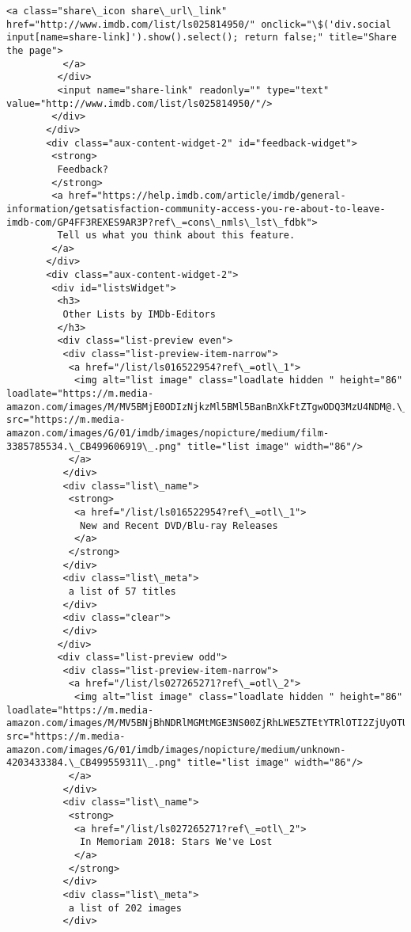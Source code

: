 \documentclass[11pt]{article}
\begin{document}
\begin{Verbatim}[commandchars=\\\{\}]
          <a class="share\_icon share\_url\_link" href="http://www.imdb.com/list/ls025814950/" onclick="\$('div.social input[name=share-link]').show().select(); return false;" title="Share the page">
          </a>
         </div>
         <input name="share-link" readonly="" type="text" value="http://www.imdb.com/list/ls025814950/"/>
        </div>
       </div>
       <div class="aux-content-widget-2" id="feedback-widget">
        <strong>
         Feedback?
        </strong>
        <a href="https://help.imdb.com/article/imdb/general-information/getsatisfaction-community-access-you-re-about-to-leave-imdb-com/GP4FF3REXES9AR3P?ref\_=cons\_nmls\_lst\_fdbk">
         Tell us what you think about this feature.
        </a>
       </div>
       <div class="aux-content-widget-2">
        <div id="listsWidget">
         <h3>
          Other Lists by IMDb-Editors
         </h3>
         <div class="list-preview even">
          <div class="list-preview-item-narrow">
           <a href="/list/ls016522954?ref\_=otl\_1">
            <img alt="list image" class="loadlate hidden " height="86" loadlate="https://m.media-amazon.com/images/M/MV5BMjE0ODIzNjkzMl5BMl5BanBnXkFtZTgwODQ3MzU4NDM@.\_V1\_UX86\_CR0,0,86,86\_AL\_.jpg" src="https://m.media-amazon.com/images/G/01/imdb/images/nopicture/medium/film-3385785534.\_CB499606919\_.png" title="list image" width="86"/>
           </a>
          </div>
          <div class="list\_name">
           <strong>
            <a href="/list/ls016522954?ref\_=otl\_1">
             New and Recent DVD/Blu-ray Releases
            </a>
           </strong>
          </div>
          <div class="list\_meta">
           a list of 57 titles
          </div>
          <div class="clear">
          </div>
         </div>
         <div class="list-preview odd">
          <div class="list-preview-item-narrow">
           <a href="/list/ls027265271?ref\_=otl\_2">
            <img alt="list image" class="loadlate hidden " height="86" loadlate="https://m.media-amazon.com/images/M/MV5BNjBhNDRlMGMtMGE3NS00ZjRhLWE5ZTEtYTRlOTI2ZjUyOTU0XkEyXkFqcGdeQXVyNDkzNTM2ODg@.\_V1\_UY86\_CR17,0,86,86\_AL\_.jpg" src="https://m.media-amazon.com/images/G/01/imdb/images/nopicture/medium/unknown-4203433384.\_CB499559311\_.png" title="list image" width="86"/>
           </a>
          </div>
          <div class="list\_name">
           <strong>
            <a href="/list/ls027265271?ref\_=otl\_2">
             In Memoriam 2018: Stars We've Lost
            </a>
           </strong>
          </div>
          <div class="list\_meta">
           a list of 202 images
          </div>

\end{Verbatim}
\end{document}
